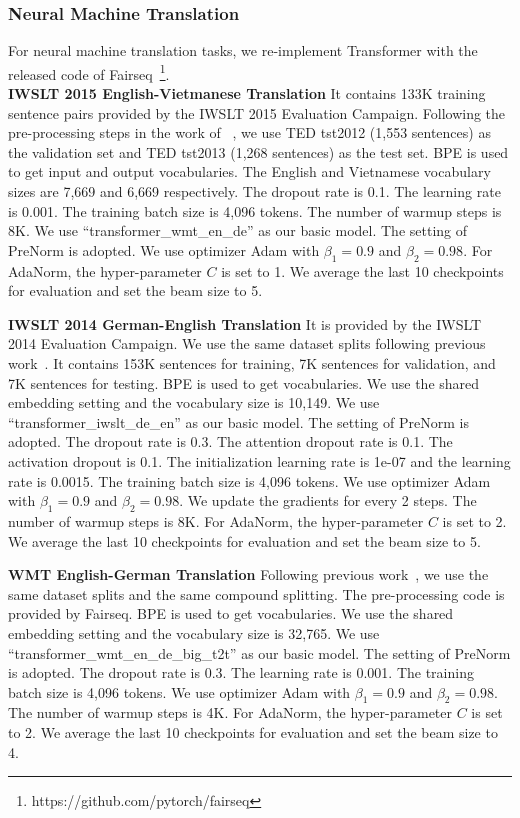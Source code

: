 \documentclass{article}
\begin{document}
\subsubsection{Neural Machine Translation}
For neural machine translation tasks, we re-implement Transformer with the released code of Fairseq~\citep{ott2019fairseq}\footnote{https://github.com/pytorch/fairseq}.  \\\textbf{IWSLT 2015 English-Vietmanese Translation} It contains 133K training
sentence pairs provided by the IWSLT 2015 Evaluation Campaign. Following
the pre-processing steps in the work of ~\cite{DBLP:conf/icml/RaffelLLWE17}, we use TED
tst2012 (1,553 sentences) as the validation set  and TED tst2013 (1,268 sentences)
as the test set. BPE is used to get input and output vocabularies. The English and Vietnamese vocabulary sizes are 7,669 and 6,669 respectively.  The dropout rate is 0.1. The learning rate is 0.001. The training batch size is  4,096 tokens. The number of warmup steps is 8K. We use ``transformer\_wmt\_en\_de'' as our basic model. The setting of PreNorm is adopted. We use optimizer Adam with $\beta_1 = 0.9$ and $\beta_2= 0.98$.   For AdaNorm, the hyper-parameter $C$ is set to 1.
We average the last 10 checkpoints for evaluation and set the beam size to 5. 

\textbf{IWSLT 2014 German-English Translation} It is provided by the IWSLT 2014 Evaluation Campaign.  We use the same dataset splits following previous work~\citep{ott2019fairseq,DBLP:journals/corr/RanzatoCAZ15,DBLP:conf/emnlp/WisemanR16}. It contains 153K sentences for training, 7K sentences for validation, and 7K sentences for testing. BPE is used to get vocabularies. We use the shared embedding setting and the vocabulary size is 10,149. We use ``transformer\_iwslt\_de\_en'' as our basic model. The setting of PreNorm is adopted.   The dropout rate is 0.3. The attention dropout rate is  0.1. The activation dropout is 0.1. The initialization learning rate is 1e-07 and the learning rate is 0.0015. The training batch size is  4,096 tokens. We use optimizer Adam with $\beta_1 = 0.9$ and $\beta_2= 0.98$.  We  update the gradients for every 2 steps. The number of warmup steps is 8K. For AdaNorm, the hyper-parameter $C$ is set to 2. We average the last 10 checkpoints for evaluation and set the beam size to 5. 



\textbf{WMT English-German Translation} Following previous work~\citep{DBLP:conf/nips/VaswaniSPUJGKP17}, we use the same dataset splits and the same compound splitting.  The pre-processing code is provided by Fairseq.  BPE is used to get vocabularies. We use the shared embedding setting and the vocabulary size is 32,765. We use ``transformer\_wmt\_en\_de\_big\_t2t'' as our basic model. The setting of PreNorm is adopted.   The dropout rate is 0.3. The learning rate is 0.001. The training batch size is  4,096 tokens. We use optimizer Adam with $\beta_1 = 0.9$ and $\beta_2= 0.98$.  The number of warmup steps is 4K. For AdaNorm, the hyper-parameter $C$ is set to 2. We average the last 10 checkpoints for evaluation and set the beam size to 4.  
\end{document}
